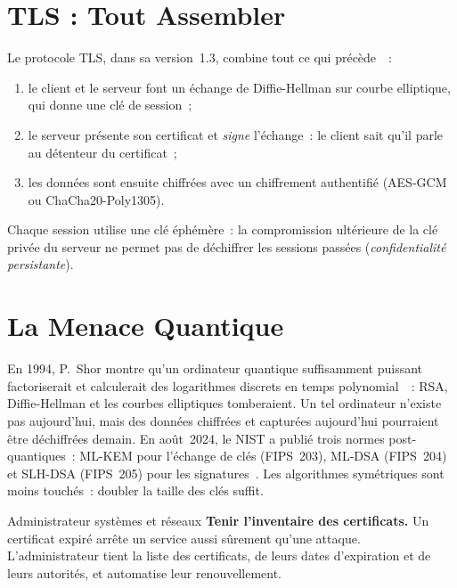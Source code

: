 \section{TLS : Tout Assembler}
\label{sec:c04-tls}

Le protocole TLS, dans sa version~1.3, combine tout ce qui précède~\cite{rfc8446}~:

\begin{enumerate}
    \item le client et le serveur font un échange de Diffie-Hellman sur
          courbe elliptique, qui donne une clé de session~;
    \item le serveur présente son certificat et \emph{signe} l'échange~:
          le client sait qu'il parle au détenteur du certificat~;
    \item les données sont ensuite chiffrées avec un chiffrement
          authentifié (AES-GCM ou ChaCha20-Poly1305).
\end{enumerate}

Chaque session utilise une clé éphémère~: la compromission ultérieure de
la clé privée du serveur ne permet pas de déchiffrer les sessions passées
(\emph{confidentialité persistante}).

\section{La Menace Quantique}
\label{sec:c04-quantique}

En 1994, P.~Shor montre qu'un ordinateur quantique suffisamment puissant
factoriserait et calculerait des logarithmes discrets en temps
polynomial~\cite{shor1994}~: RSA, Diffie-Hellman et les courbes
elliptiques tomberaient. Un tel ordinateur n'existe pas aujourd'hui, mais
des données chiffrées et capturées aujourd'hui pourraient être déchiffrées
demain. En août~2024, le NIST a publié trois normes post-quantiques~:
ML-KEM pour l'échange de clés (FIPS~203), ML-DSA (FIPS~204) et SLH-DSA
(FIPS~205) pour les signatures~\cite{fips203,fips204,fips205}. Les
algorithmes symétriques sont moins touchés~: doubler la taille des clés
suffit.

\begin{boxmetier}{Administrateur systèmes et réseaux}
\textbf{Tenir l'inventaire des certificats.} Un certificat expiré arrête
un service aussi sûrement qu'une attaque. L'administrateur tient la liste
des certificats, de leurs dates d'expiration et de leurs autorités, et
automatise leur renouvellement.
\end{boxmetier}


